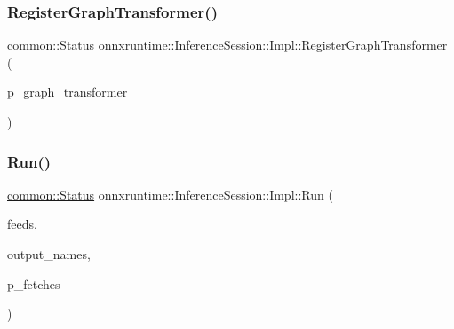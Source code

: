 \subsubsection{\texorpdfstring{Register\+Graph\+Transformer()}{RegisterGraphTransformer()}}
{\footnotesize\ttfamily \mbox{\hyperlink{classonnxruntime_1_1common_1_1Status}{common\+::\+Status}} onnxruntime\+::\+Inference\+Session\+::\+Impl\+::\+Register\+Graph\+Transformer (\begin{DoxyParamCaption}\item[{std\+::unique\+\_\+ptr$<$ \mbox{\hyperlink{classonnxruntime_1_1GraphTransformer}{onnxruntime\+::\+Graph\+Transformer}} $>$}]{p\+\_\+graph\+\_\+transformer }\end{DoxyParamCaption})\hspace{0.3cm}{\ttfamily [inline]}}

\mbox{\label{classonnxruntime_1_1InferenceSession_1_1Impl_a3638c45d73a93fff19578b4e1be0fc34}} 
\subsubsection{\texorpdfstring{Run()}{Run()}\hspace{0.1cm}{\footnotesize\ttfamily [1/4]}}
{\footnotesize\ttfamily \mbox{\hyperlink{classonnxruntime_1_1common_1_1Status}{common\+::\+Status}} onnxruntime\+::\+Inference\+Session\+::\+Impl\+::\+Run (\begin{DoxyParamCaption}\item[{const \mbox{\hyperlink{namespaceonnxruntime_a48b01f0410ec8d693dbd40d1132bd66c}{Name\+M\+L\+Val\+Map}} \&}]{feeds,  }\item[{const std\+::vector$<$ std\+::string $>$ \&}]{output\+\_\+names,  }\item[{std\+::vector$<$ \mbox{\hyperlink{classonnxruntime_1_1MLValue}{M\+L\+Value}} $>$ $\ast$}]{p\+\_\+fetches }\end{DoxyParamCaption})\hspace{0.3cm}{\ttfamily [inline]}}

\mbox{\label{classonnxruntime_1_1InferenceSession_1_1Impl_aa904ca4de813164cfb8bc0608498d9ae}} 
